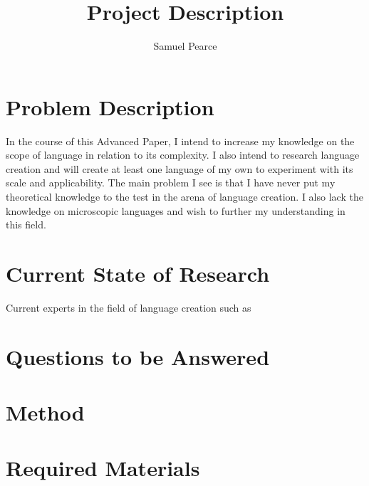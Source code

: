 \documentclass[a4paper,10pt]{article}
\title{Project Description}
\author{Samuel Pearce}
\begin{document}
\maketitle

\tableofcontents

\pagebreak

\section{Problem Description}
In the course of this Advanced Paper, I intend to increase my knowledge on the scope of
language in relation to its complexity. I also intend to research language creation and
will create at least one language of my own to experiment with its scale and applicability.
The main problem I see is that I have never put my theoretical knowledge to the test in
the arena of language creation. I also lack the knowledge on microscopic languages and
wish to further my understanding in this field.

\section{Current State of Research}
Current experts in the field of language creation such as 

\section{Questions to be Answered}

\section{Method}

\section{Required Materials}
\end{document}
